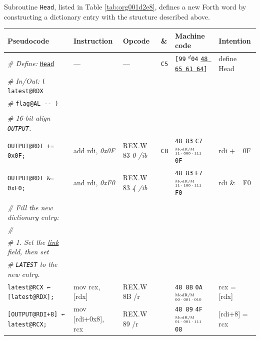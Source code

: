 \documentclass[a4paper,12pt,final]{article}
\begin{document}
Subroutine \texttt{Head}, listed in Table \ref{tab:org001d2e8}, defines a new
Forth word by constructing a dictionary entry with the structure
described above.

\begin{table}[!htbp] \begin{adjustwidth}{-1cm}{-1cm} \fontsize{10}{12.000000}\selectfont
\begin{center}
\begin{tabular}{l|ll|l|lH}
\textbf{Pseudocode} & \textbf{Instruction} & \textbf{Opcode} & \textbf{\&} & \textbf{Machine code} & \textbf{Intention}\\[0pt]
\hline
\emph{\# Define:} \uline{\texttt{Head}} & --- & --- & \texttt{C5} & \texttt{[99} \(^{d}\)​\texttt{04} \uline{\texttt{48 65 61 64}}​\texttt{]} & define Head\\[0pt]
\emph{\# In/Out:} \texttt{( latest@RDX} &  &  &  &  & \\[0pt]
\emph{\#}\hspace{4.9em}   \texttt{flag@AL -​- )} &  &  &  &  & \\[0pt]
 &  &  &  &  & \\[0pt]
\emph{\# 16-bit align \texttt{OUTPUT}.} &  &  &  &  & \\[0pt]
\texttt{OUTPUT@RDI += 0x0F;} & add rdi, \emph{0x0F} & REX.W 83 \emph{0 /ib} & \texttt{CB} & \texttt{48 83} \texttt{C7}​\(^{\text{\tiny ModR/M}}_{\text{\tiny 11·000·111}}\) \texttt{0F} & rdi += 0F\\[0pt]
\texttt{OUTPUT@RDI \&= 0xF0;} & and rdi, \emph{0xF0} & REX.W 83 \emph{4 /ib} &  & \texttt{48 83} \texttt{E7}​\(^{\text{\tiny ModR/M}}_{\text{\tiny 11·100·111}}\) \texttt{F0} & rdi \&= F0\\[0pt]
 &  &  &  &  & \\[0pt]
\emph{\# Fill the new dictionary entry:} &  &  &  &  & \\[0pt]
\emph{\#} &  &  &  &  & \\[0pt]
\emph{\# 1. Set the \uline{link} field, then set} &  &  &  &  & \\[0pt]
\emph{\# \texttt{LATEST} to the new entry.} &  &  &  &  & \\[0pt]
\texttt{latest@RCX ← [latest@RDX];} & mov rcx, [rdx] & REX.W 8B /r &  & \texttt{48 8B} \texttt{0A}​\(^{\text{\tiny ModR/M}}_{\text{\tiny 00·001·010}}\) & rcx = [rdx]\\[0pt]
\texttt{[OUTPUT@RDI+8] ← latest@RCX;} & mov [rdi+0x8], rcx & REX.W 89 /r &  & \texttt{48 89} \texttt{4F}​\(^{\text{\tiny ModR/M}}_{\text{\tiny 01·001·111}}\) \texttt{08} & [rdi+8] = rcx\\[0pt]

\end{tabular}
\end{center}
\end{adjustwidth}
\end{table}
\end{document}
